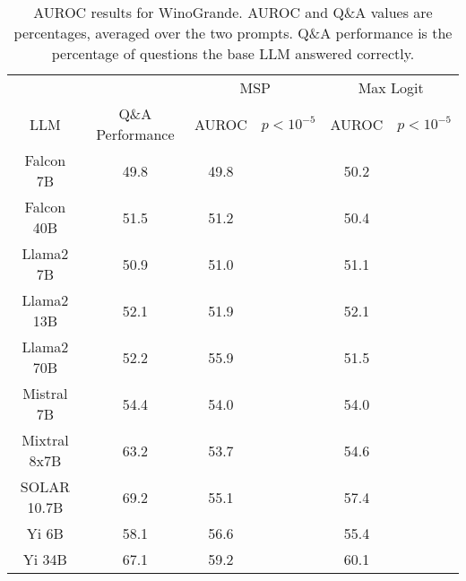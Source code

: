 \begin{table*}
\centering
\begin{tabular}{c|c|c|c|c|c}
& & \multicolumn{2}{c|}{MSP} & \multicolumn{2}{c}{Max Logit} \\ 
LLM & Q\&A Performance & AUROC & $p < 10^{-5}$ & AUROC & $p < 10^{-5}$\\ \hline
Falcon 7B & 49.8 & 49.8 &  & 50.2 & \\
Falcon 40B & 51.5 & 51.2 &  & 50.4 & \\
Llama2 7B & 50.9 & 51.0 &  & 51.1 & \\
Llama2 13B & 52.1 & 51.9 &  & 52.1 & \\
Llama2 70B & 52.2 & 55.9 &  & 51.5 & \\
Mistral 7B & 54.4 & 54.0 &  & 54.0 & \\
Mixtral 8x7B & 63.2 & 53.7 &  & 54.6 & \\
SOLAR 10.7B & 69.2 & 55.1 &  & 57.4 & \\
Yi 6B & 58.1 & 56.6 &  & 55.4 & \\
Yi 34B & 67.1 & 59.2 &  & 60.1 & \\
\hline
\end{tabular}
\caption{AUROC results for WinoGrande. AUROC and Q\&A values are percentages, averaged over the two prompts. Q\&A performance is the percentage of questions the base LLM answered correctly.}
\label{tab:winogrande_auroc}
\end{table*}
